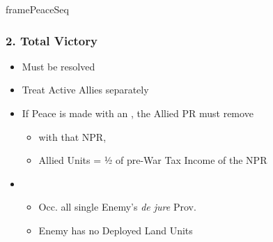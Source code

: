 \documentclass[10pt]{article}
\newlength{\fhPeaceSeq} \setlength\fhPeaceSeq{23.5\baselineskip}
\begin{document}
\begin{dynamiccontents*}{framePeaceSeq}
\begin{eubox}{\fhPeaceSeq}
\begin{multicols}{3}
		\subsubsection*{2. Total Victory}
		\begin{itemize}
			\item Must be resolved
			\item Treat Active Allies separately
			\item If Peace is made with an , the Allied PR must remove
			\begin{itemize}
				\item \alliance with that NPR, 
				\item Allied Units = ½ of pre-War Tax Income of the NPR
			\end{itemize}
			\item {}
			\begin{itemize}
				\item Occ. all single Enemy's \emph{de jure} Prov.
				\item Enemy has no Deployed Land Units
			\end{itemize}
		\end{itemize}


\end{multicols}
\end{eubox}
\end{dynamiccontents*}
\end{document}
